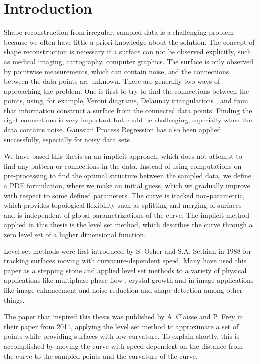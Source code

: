 \chapter{Introduction}
Shape reconstruction from irregular, sampled data is a challenging problem because we often have little a priori knowledge about the solution. The concept of shape reconstruction is necessary if a surface can not be observed explicitly, such as medical imaging, cartography, computer graphics. The surface is only observed by pointwise measurements, which can contain noise, and the connections between the data points are unknown. There are generally two ways of approaching the problem. One is first to try to find the connections between the points, using, for example, Veroni diagrams, Delaunay triangulations \cite{delauny} \cite{veronitri} \cite{KNN}, and from that information construct a surface from the connected data points. Finding the right connections is very important but could be challenging, especially when the data contains noise. Gaussian Process Regression has also been applied successfully, especially for noisy data sets \cite{GP-MPU}.

We have based this thesis on an implicit approach, which does not attempt to find any pattern or connections in the data. Instead of using computations on pre-processing to find the optimal structure between the sampled data, we define a PDE formulation, where we make an initial guess, which we gradually improve with respect to some defined parameters. The curve is tracked non-parametric, which provides topological flexibility such as splitting and merging of surfaces and is independent of global parametrizations of the curve. The implicit method applied in this thesis is the level set method, which describes the curve through a zero level set of a higher dimensional function. 

Level set methods were first introduced by S. Osher and S.A. Sethian \cite{Osher-Sethian} in 1988 for tracking surfaces moving with curvature-dependent speed. Many have used this paper as a stepping stone and applied level set methods to a variety of physical applications like multiphase phase flow \cite{SUSSMAN1994146} \cite{ZHAO1996179}, crystal growth \cite{sethian1999level} and in image applications like image enhancement and noise reduction \cite{sethian1999level} \cite{RUDIN1992259} and shape detection \cite{368173} \cite{sethian1999level} \cite{5754584} among other things.

The paper that inspired this thesis was published by A. Claisse and P. Frey in their paper from 2011\cite{Claisse-Frey}, applying the level set method to approximate a set of points while providing surfaces with low curvature. To explain shortly, this is accomplished by moving the curve with speed dependent on the distance from the curve to the sampled points and the curvature of the curve.

